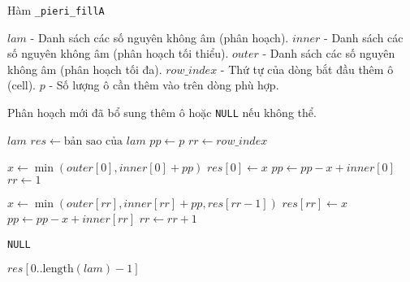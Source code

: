 \documentclass[11pt,a4paper]{book}
\begin{document}
\begin{algorithm}
	\caption{Hàm \texttt{\_pieri\_fillA}}
	\begin{algorithmic}[1] %
	
	\Require 
	\State $lam$ - Danh sách các số nguyên không âm (phân hoạch).
	\State $inner$ - Danh sách các số nguyên không âm (phân hoạch tối thiểu).
	\State $outer$ - Danh sách các số nguyên không âm (phân hoạch tối đa).
	\State $row\_index$ - Thứ tự của dòng bắt đầu thêm ô (cell).
	\State $p$ - Số lượng ô cần thêm vào trên dòng phù hợp.
	
	\Ensure Phân hoạch mới đã bổ sung thêm ô hoặc \texttt{NULL} nếu không thể.
	
		\State \Return $lam$ 
	\EndIf
	\State $res \leftarrow \text{bản sao của } lam$ 
	\State $pp \leftarrow p$
	\State $rr \leftarrow row\_index$
	
		\State $x \leftarrow \min(outer[0], inner[0] + pp)$ 
		\State $res[0] \leftarrow x$
		\State $pp \leftarrow pp - x + inner[0]$
		\State $rr \leftarrow 1$
	\EndIf
	
	 
		\State $x \leftarrow \min(outer[rr], inner[rr] + pp, res[rr - 1])$
		\State $res[rr] \leftarrow x$
		\State $pp \leftarrow pp - x + inner[rr]$
		\State $rr \leftarrow rr + 1$
	\EndWhile
	
		\State \Return \texttt{NULL} 
	\EndIf
	
	\State \Return $res[0..\text{length}(lam)-1]$ 
	
	\end{algorithmic}
\end{algorithm}
\end{document}
